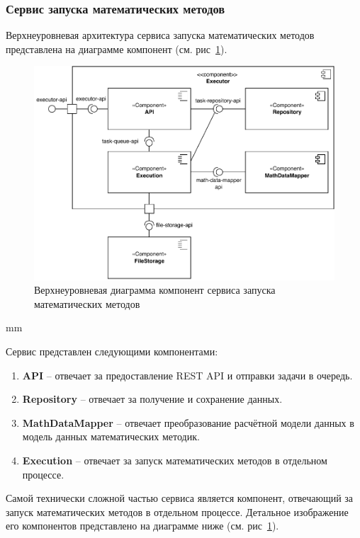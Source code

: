 \subsubsection{\large{Сервис запуска математических методов}}

Верхнеуровневая архитектура сервиса запуска математических методов представлена на диаграмме компонент
(см. рис\ \ref{pic:architecture__executor-component}).

\begin{figure}[H]
	\hspace*{-2.5 cm}\includegraphics[width=\textwidth]{architecture/pictures/executor/component_common}
	\caption{Верхнеуровневая диаграмма компонент сервиса запуска математических методов}
	\label{pic:architecture__executor-component}
\end{figure}
 mm

Сервис представлен следующими компонентами:
\begin{enumerate}
	\item {
		\textbf{API} -- отвечает за предоставление REST API и отправки задачи в очередь.
	}
	\item {
		\textbf{Repository} -- отвечает за получение и сохранение данных.
	}
	\item {
		\textbf{MathDataMapper} -- отвечает преобразование расчётной модели данных в модель данных математических методик.
	}
	\item {
		\textbf{Execution} -- отвечает за запуск математических методов в отдельном процессе.
	}
\end{enumerate}

Самой технически сложной частью сервиса является компонент, отвечающий за запуск математических методов
в отдельном процессе. Детальное изображение его компонентов представлено
на диаграмме ниже (см. рис\ \ref{pic:architecture__executor-component}).

